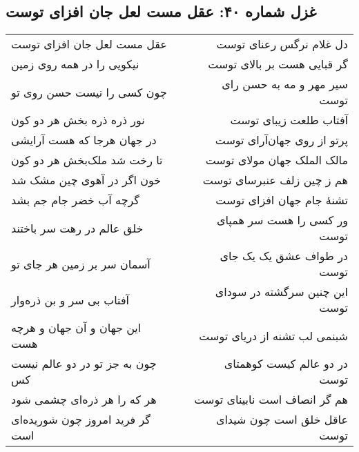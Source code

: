 \begin{center}
\section*{غزل شماره ۴۰: عقل مست لعل جان افزای توست}
\label{sec:040}
\begin{longtable}{l p{0.5cm} r}
عقل مست لعل جان افزای توست
&&
دل غلام نرگس رعنای توست
\\
نیکویی را در همه روی زمین
&&
گر قبایی هست بر بالای توست
\\
چون کسی را نیست حسن روی تو
&&
سیر مهر و مه به حسن رای توست
\\
نور ذره ذره بخش هر دو کون
&&
آفتاب طلعت زیبای توست
\\
در جهان هرجا که هست آرایشی
&&
پرتو از روی جهان‌آرای توست
\\
تا رخت شد ملک‌بخش هر دو کون
&&
مالک الملک جهان مولای توست
\\
خون اگر در آهوی چین مشک شد
&&
هم ز چین زلف عنبرسای توست
\\
گرچه آب خضر جام جم بشد
&&
تشنهٔ جام جهان افزای توست
\\
خلق عالم در رهت سر باختند
&&
ور کسی را هست سر همپای توست
\\
آسمان سر بر زمین هر جای تو
&&
در طواف عشق یک یک جای توست
\\
آفتاب بی سر و بن ذره‌وار
&&
این چنین سرگشته در سودای توست
\\
این جهان و آن جهان و هرچه هست
&&
شبنمی لب تشنه از دریای توست
\\
چون به جز تو در دو عالم نیست کس
&&
در دو عالم کیست کوهمتای توست
\\
هر که را هر ذره‌ای چشمی شود
&&
هم گر انصاف است نابینای توست
\\
گر فرید امروز چون شوریده‌ای است
&&
عاقل خلق است چون شیدای توست
\\
\end{longtable}
\end{center}
